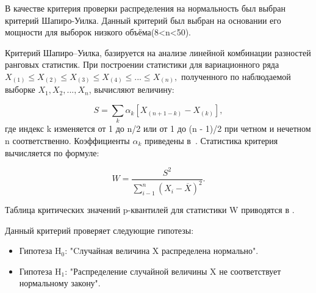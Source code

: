 В качестве критерия проверки распределения на нормальность был выбран критерий Шапиро-Уилка. Данный критерий был выбран на основании его мощности для выборок низкого объёма(8<n<50)\cite{Shapiro}.

Критерий Шапиро–Уилка, базируется на анализе линейной
комбинации разностей ранговых статистик. При построении статистики для вариационного ряда $ X_{(1)} \leq X_{(2)} \leq X_{(3)} \leq X_{(4)} \leq ... \leq X_{(n)}, $ полученного по наблюдаемой выборке $X_{1}, X_{2}, ... , X_{n}$, вычисляют величину\cite{RANstat}:

\begin{equation} \label{eq:Shapiro_S}
	S = \sum_{k}\alpha_{k}[X_{(n+1-k)} - X_{(k)}],
\end{equation}
где индекс k изменяется от 1 до n/2 или от 1 до (n - 1)/2 при четном и нечетном n соответственно. Коэффициенты $\alpha_{k}$ приведены в~\cite{Shapiro}.
Статистика критерия вычисляется по формуле:

\begin{equation} \label{eq:Shapiro_W}
	W = \frac{S^2}{\sum_{i-1}^{n}(X_{i}-\overline{X})^2}.
\end{equation}

Таблица критических значений p-квантилей для статистики W приводятся в \cite{shapiro_GOST}.

Данный критерий проверяет следующие гипотезы:
\begin{itemize}
	\item Гипотеза H$_{0}$: "Cлучайная величина X распределена нормально".
	\item Гипотеза H$_{1}$: "Распределение случайной величины X не соответствует нормальному закону". 
\end{itemize}

